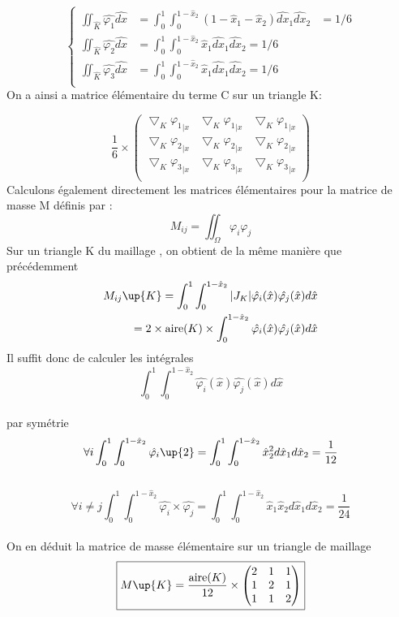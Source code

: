 \documentclass[a4paper,12pt,titlepage]{report}
\begin{document}
\begin{onehalfspace}
\[	
  \left\{
    \begin{aligned}
      \iint_{\hat{K}} \hat{\varphi_1}{\hat{dx}} &= \int_{0}^{1}\int_{0}^{1-{\hat{x}}_2} (1-{{\hat{x}}_1}-{{\hat{x}}_2}) \hat{dx}_1 \hat{dx}_2 &=1/6\\
      \iint_{\hat{K} } \hat{\varphi_2}\hat{dx} &= \int_{0}^{1}\int_{0}^{1-{\hat{x}}_2} {{\hat{x}}_1} \hat{dx}_1 \hat{dx}_2 =1/6\\
       \iint_{\hat{K} } \hat{\varphi_3}\hat{dx} &= \int_{0}^{1}\int_{0}^{1-{\hat{x}}_2} {{\hat{x}}_1} \hat{dx}_1 \hat{dx}_2 =1/6\\
    \end{aligned}
  \right.
\]
\newpage
On a ainsi a matrice élémentaire du terme C sur un triangle K:

\[
\frac{1}{6}\times
	\begin{pmatrix}
   		\bigtriangledown_{K}{\varphi_1}_{|x} & \bigtriangledown_{K}{\varphi_1}_{|x} &  										    
   		\bigtriangledown_{K} {\varphi_1}_{|x} \\ 
    	\bigtriangledown_{K }{\varphi_2}_{|x} & \bigtriangledown_{K }{\varphi_2}_{|x} &  
    	\bigtriangledown_{K }{\varphi_2}_{|x} \\    										        
    	\bigtriangledown_{K}{\varphi_3}_{|x} & \bigtriangledown_{K}{\varphi_3}_{|x} & \bigtriangledown_{K}{\varphi_3}_{|x} \\ 
    \end{pmatrix} 
\]
\newline
Calculons également directement les matrices élémentaires pour la matrice de masse M définis par :
\[
M_{ij}=\iint_\Omega \varphi_i \varphi_j
\]
Sur un triangle K du maillage , on obtient de la même manière que précédemment 
\[
  \left.
    \begin{aligned}
		M_{ij}\up{K}=\int_0^{1}\int_0^{1-{\hat{x}}_2}|J_K|\hat{\varphi_i}(\hat{x})\hat{\varphi_j}(\hat{x})d\hat{x}\\
		=2\times\text{aire}(K)\times\int_0^{1-{\hat{x}}_2}\hat{\varphi_i}(\hat{x})\hat{\varphi_j}(\hat{x})d\hat{x}
    \end{aligned}
  \right.
\]
Il suffit donc de calculer les intégrales 
\[
	\int _0^{1}\int_0^{1-{\hat{x}}_2}\hat{\varphi_i}(\hat{x})\hat{\varphi_j}(\hat{x})d\hat{x}
\]
\\
par symétrie 
\[
	\forall i \int _0^{1}\int_0^{1-\hat{x}_{2}}\hat{\varphi_i}\up{2}= \int _0^{1} \int_0^{1-\hat{x}_{2}}\hat{x}_{2}^{2}d\hat{x}_{1}d\hat{x}_{2}=\frac{1}{12}
\]
\\%
\[
	\forall i \neq j \int _0^{1}\int_0^{1-{\hat{x}}_2}\hat{\varphi_i} \times \hat{\varphi_j}=\int _0^{1} \int_0^{1-\hat{x}_{2}}\hat{x}_{1}\hat{x}_{2}d\hat{x}_{1}d\hat{x}_{2}=\frac{1}{24}
\]
\\%
On en déduit la matrice de masse élémentaire sur un triangle de maillage 
\\%
\[
	\boxed{M\up{K}=\frac{\text{aire}(K)}{12}\times 
	\begin{pmatrix}
   		2 & 1 & 1 \\
   		1 &  2 & 1 \\
   		1 &  1 & 2
	\end{pmatrix}}
\]


\end{onehalfspace}
\end{document}
